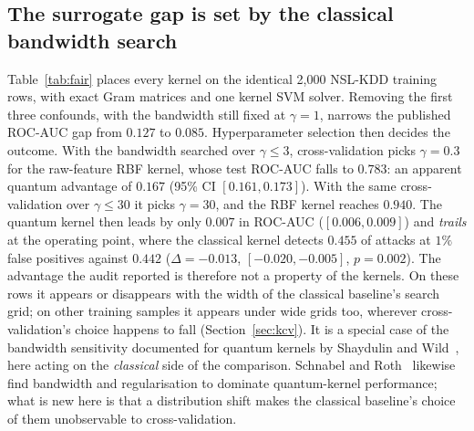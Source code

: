 \documentclass[preprint,11pt]{elsarticle}
\begin{document}
\subsection{The surrogate gap is set by the classical bandwidth search}\label{sec:kgap}
Table~\ref{tab:fair} places every kernel on the identical 2{,}000 NSL-KDD training rows, with exact Gram
matrices and one kernel SVM solver. Removing the first three confounds, with the bandwidth still fixed at
$\gamma=1$, narrows the published ROC-AUC gap from $0.127$ to $0.085$. Hyperparameter selection then
decides the outcome. With the bandwidth searched over $\gamma\le3$, cross-validation picks $\gamma=0.3$ for
the raw-feature RBF kernel, whose test ROC-AUC falls to $0.783$: an apparent quantum advantage of $0.167$
(95\% CI $[0.161,0.173]$). With the same cross-validation over $\gamma\le30$ it picks $\gamma=30$, and the RBF
kernel reaches $0.940$. The quantum kernel then leads by only $0.007$ in ROC-AUC ($[0.006,0.009]$) and
\emph{trails} at the operating point, where the classical kernel detects $0.455$ of attacks at $1\%$ false
positives against $0.442$ ($\Delta=-0.013$, $[-0.020,-0.005]$, $p=0.002$). The advantage the audit reported
is therefore not a property of the kernels. On these rows it appears or disappears with the width of the classical baseline's search grid; on other
training samples it appears under wide grids too, wherever cross-validation's choice happens to fall
(Section~\ref{sec:kcv}). It is a special case of the bandwidth sensitivity documented for quantum kernels by
Shaydulin and Wild~\cite{shaydulin2022bandwidth}, here acting on the \emph{classical} side of the
comparison. Schnabel and Roth~\cite{schnabel2025scrutiny} likewise find bandwidth and regularisation to
dominate quantum-kernel performance; what is new here is that a distribution shift makes the classical
baseline's choice of them unobservable to cross-validation.
\end{document}
